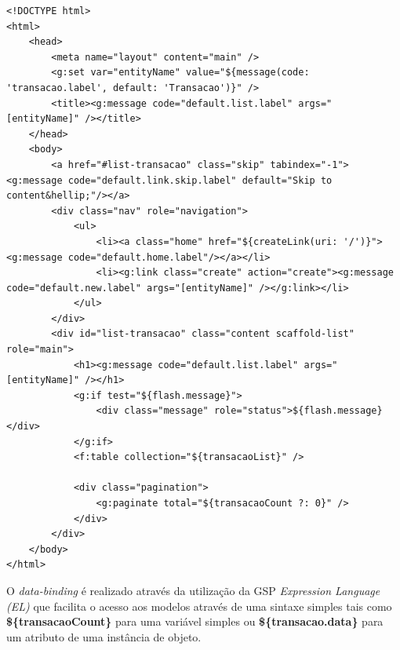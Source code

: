 \begin{lstlisting}[caption=Visão    {\bf    transacao/index.gsp},    frame=trBL,
    float=htbp, label=codIndex]
<!DOCTYPE html>
<html>
    <head>
        <meta name="layout" content="main" />
        <g:set var="entityName" value="${message(code: 'transacao.label', default: 'Transacao')}" />
        <title><g:message code="default.list.label" args="[entityName]" /></title>
    </head>
    <body>
        <a href="#list-transacao" class="skip" tabindex="-1"><g:message code="default.link.skip.label" default="Skip to content&hellip;"/></a>
        <div class="nav" role="navigation">
            <ul>
                <li><a class="home" href="${createLink(uri: '/')}"><g:message code="default.home.label"/></a></li>
                <li><g:link class="create" action="create"><g:message code="default.new.label" args="[entityName]" /></g:link></li>
            </ul>
        </div>
        <div id="list-transacao" class="content scaffold-list" role="main">
            <h1><g:message code="default.list.label" args="[entityName]" /></h1>
            <g:if test="${flash.message}">
                <div class="message" role="status">${flash.message}</div>
            </g:if>
            <f:table collection="${transacaoList}" />

            <div class="pagination">
                <g:paginate total="${transacaoCount ?: 0}" />
            </div>
        </div>
    </body>
</html> 
\end{lstlisting}

\noindent O  {\it data-binding}  é realizado através  da utilização da  GSP {\it
  Expression Language  (EL)} que  facilita o acesso  aos modelos através  de uma
sintaxe simples  tais como {\bf \$\{transacaoCount\}} para  uma variável simples
ou {\bf \$\{transacao.data\}} para um atributo de uma instância de objeto.






